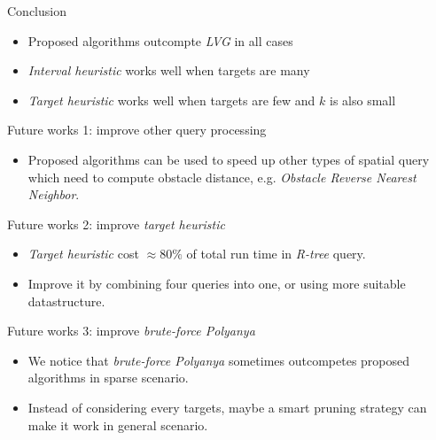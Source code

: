 \begin{frame}{Conclusion}
    \begin{itemize}
        \item Proposed algorithms outcompte \textit{LVG} in all cases
        \item \textit{Interval heuristic} works well when targets are many
        \item \textit{Target heuristic} works well when targets are few and $k$ is also small
    \end{itemize}
\end{frame}

\begin{frame}{Future works 1: improve other query processing}
    \begin{itemize}
        \item \small{
            Proposed algorithms can be used to speed up other types of spatial query which need to compute obstacle distance, e.g. \textit{Obstacle Reverse Nearest Neighbor}.
        }
    \end{itemize}
\end{frame}

\begin{frame}{Future works 2: improve \textit{target heuristic}}
    \begin{itemize}
        \item \small {
          \textit{Target heuristic} cost $\approx 80\%$ of total run time in \textit{R-tree} query. 
        }
        \item \small {
            Improve it by combining four queries into one, or using more suitable datastructure.
        }
    \end{itemize}
\end{frame}

\begin{frame}{Future works 3: improve \textit{brute-force Polyanya}}
    \begin{itemize}
        \item \small {
            We notice that \textit{brute-force Polyanya} sometimes outcompetes proposed algorithms in sparse scenario.
        }
        \item \small {
            Instead of considering every targets, maybe a smart pruning strategy can make it work in general scenario. 
        }
    \end{itemize}
\end{frame}